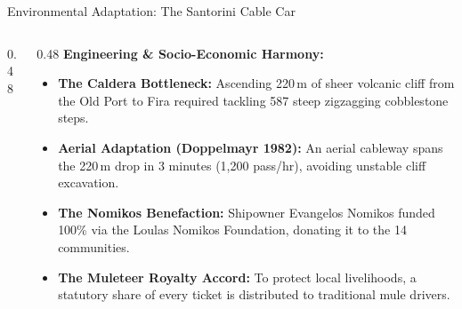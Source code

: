 \begin{frame}[label=cablecar]{Environmental Adaptation: The Santorini Cable Car}
  \begin{columns}[T, onlytextwidth]
    \begin{column}{0.48\textwidth}
    \end{column}
    
    \begin{column}{0.48\textwidth}
      \textbf{\color{aegeanblue}Engineering \& Socio-Economic Harmony:}
      \vspace{0.1em}
      \begin{itemize}
        \setlength{\itemsep}{0.12em}
        \item \textbf{The Caldera Bottleneck:} Ascending 220\,m of sheer volcanic cliff from the Old Port to Fira required tackling 587 steep zigzagging cobblestone steps.
        \item \textbf{Aerial Adaptation (Doppelmayr 1982):} An aerial cableway spans the 220\,m drop in 3 minutes (1,200 pass/hr), avoiding unstable cliff excavation.
        \item \textbf{The Nomikos Benefaction:} Shipowner Evangelos Nomikos funded 100\% via the Loulas Nomikos Foundation, donating it to the 14 communities.
        \item \textbf{The Muleteer Royalty Accord:} To protect local livelihoods, a statutory share of every ticket is distributed to traditional mule drivers.
      \end{itemize}
    \end{column}
  \end{columns}
\end{frame}
